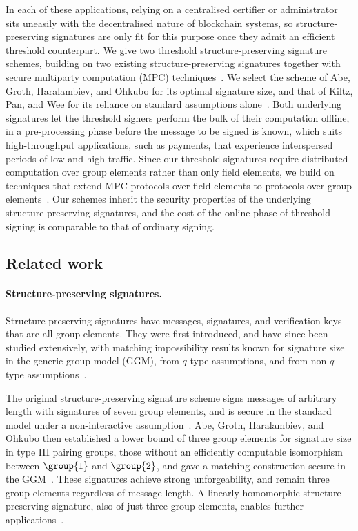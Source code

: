 In each of these applications, relying on a centralised certifier or
administrator sits
uneasily with the decentralised nature of blockchain systems, so
structure-preserving signatures are only fit for this purpose once they admit
an efficient threshold counterpart. We give two threshold
structure-preserving signature schemes, building on two existing
structure-preserving signatures together with secure multiparty computation
(MPC) techniques~\cite{C:AGHO11,C:KilPanWee15,C:DPSZ12,CCS:KelOrsSch16,C:GLOPS21}.
We select the scheme of Abe, Groth, Haralambiev, and Ohkubo for its optimal
signature size, and that of Kiltz, Pan, and Wee for its reliance on standard
assumptions alone~\cite{C:AGHO11,C:KilPanWee15}. Both underlying signatures
let the threshold signers perform the bulk of their computation offline, in a
pre-processing phase before the message to be signed is known, which suits
high-throughput applications, such as payments, that experience interspersed
periods of low and high traffic. Since our threshold signatures require
distributed computation over group elements rather than only field elements,
we build on techniques that extend MPC protocols over field elements to
protocols over group elements~\cite{NDSS:GPVRNC23}. Our schemes inherit the
security properties of the underlying structure-preserving signatures, and
the cost of the online phase of threshold signing is comparable to that of
ordinary signing.

\subsection{Related work}\label{sec:tsps-related}

\paragraph{Structure-preserving signatures.} Structure-preserving signatures
have messages, signatures, and verification keys that are all group elements.
They were first introduced, and have since been studied extensively, with
matching impossibility results known for signature size in the generic group
model (GGM), from $q$-type assumptions, and from non-$q$-type
assumptions~\cite{C:AFGHO10,C:AGHO11,AC:AbeGroOhk11}.

The original structure-preserving signature scheme signs messages of
arbitrary length with signatures of seven group elements, and is secure in
the standard model under a non-interactive assumption~\cite{C:AFGHO10}. Abe,
Groth, Haralambiev, and Ohkubo then established a lower bound of three group
elements for signature size in type III pairing groups, those without an
efficiently computable isomorphism between $\group{1}$ and $\group{2}$, and
gave a matching construction secure in the GGM~\cite{C:AGHO11}. These
signatures achieve strong unforgeability, and remain three group elements
regardless of message length. A linearly homomorphic structure-preserving
signature, also of just three group elements, enables further
applications~\cite{C:LPJY13}.

